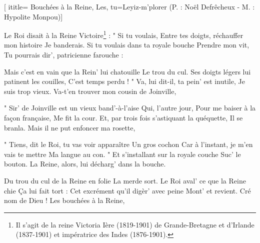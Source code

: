  [
ititle= {Bouchées à la Reine, Les},
tu={Leyiz-m'plorer (P. : Noël Defrêcheux - M. : Hypolite Monpou)}]

\beginverse
Le Roi disait à la Reine Victoire\footnote {Il s'agit de la reine Victoria Ière (1819-1901) de Grande-Bretagne et d'Irlande (1837-1901) et
impératrice des Indes (1876-1901).} :
" Si tu voulais,
Entre tes doigts, réchauffer mon histoire
Je banderais.
Si tu voulais dans ta royale bouche
Prendre mon vit,
Tu pourrais dir', patricienne farouche :
\endverse

\beginverse
Mais c'est en vain que la Rein' lui chatouille
Le trou du cul.
Ses doigts légers lui patinent les couilles,
C'est temps perdu !
" Va, lui dit-il, ta pein' est inutile,
Je suis trop vieux.
Va-t'en trouver mon cousin de Joinville,
\endverse

\beginverse
" Sir' de Joinville est un vieux band'-à-l'aise
Qui, l'autre jour,
Pour me baiser à la façon française,
Me fit la cour.
Et, par trois fois s'astiquant la quéquette,
Il se branla.
Mais il ne put enfoncer ma rosette,
\endverse

\beginverse
" Tiens, dit le Roi, tu vas voir apparaître
Un gros cochon
Car à l'instant, je m'en vais te mettre
Ma langue au con. "
Et s'installant sur la royale couche
Suc' le bouton.
La Reine, alors, lui décharg' dans la bouche.
\endverse

\beginverse
Du trou du cul de la Reine en folie
La merde sort.
Le Roi aval' ce que la Reine chie
Ça lui fait tort :
Cet excrément qu'il digèr' avec peine
Mont' et revient.
Cré nom de Dieu ! Les bouchées à la Reine,
\endverse

\endsong